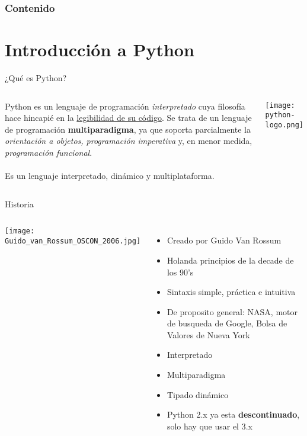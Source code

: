 \begin{frame}
    \frametitle{Contenido}
    \tableofcontents
\end{frame}

\section{Introducción a Python}

\begin{frame}[c]{¿Qué es Python?}
    \begin{columns}
        Python es un lenguaje de programación \textit{interpretado} cuya
        filosofía hace hincapié en la \underline{legibilidad de su código}.
        Se trata de un lenguaje de programación \textbf{multiparadigma}, ya
        que soporta parcialmente la \textit{orientación a objetos,
        programación imperativa} y, en menor medida, \textit{programación
        funcional}. \\~\\

        Es un lenguaje interpretado, dinámico y multiplataforma. 
        \begin{center}
            \texttt{[image: python-logo.png]}
        \end{center}
    \end{columns}
\end{frame}

\begin{frame}[c]{Historia}
  \begin{columns}
        \begin{center}
            \texttt{[image: Guido\_van\_Rossum\_OSCON\_2006.jpg]}
        \end{center}
    \begin{itemize}
      \item Creado por Guido Van Rossum
      \pausa
      \item Holanda principios de la decade de los 90's
      \pausa
      \item Sintaxis simple, práctica e intuitiva
      \pausa
      \item De proposito general: NASA, motor de busqueda de Google, Bolsa de
        Valores de Nueva York
      \pausa
      \item Interpretado
      \pausa
      \item Multiparadigma
      \pausa
      \item Tipado dinámico
      \pausa
      \item Python 2.x ya esta \textbf{descontinuado}, solo hay que usar el 3.x
    \end{itemize}
  \end{columns}
\end{frame}

